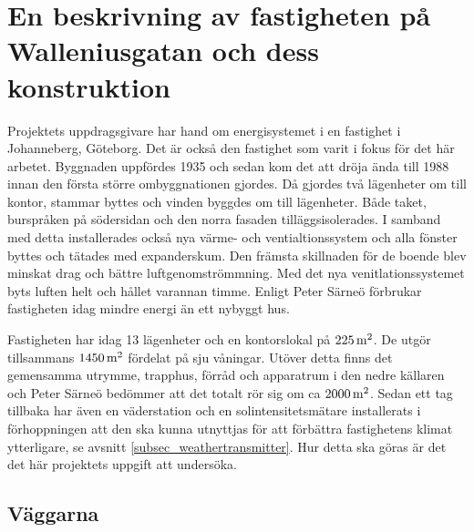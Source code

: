 \section{En beskrivning av fastigheten på Walleniusgatan och dess konstruktion}
\label{subsec:thehouse}




Projektets uppdragsgivare har hand om energisystemet i en fastighet i Johanneberg, Göteborg. Det är också den fastighet som varit i fokus för det här arbetet. Byggnaden uppfördes 1935\cite{ritningar_urspr} och sedan kom det att dröja ända till 1988 innan den första större ombyggnationen gjordes. Då gjordes två lägenheter om till kontor, stammar byttes och vinden byggdes om till lägenheter. Både taket, burspråken på södersidan och den norra fasaden tilläggsisolerades. I samband med detta installerades också nya värme- och ventialtionssystem och alla fönster byttes och tätades med expanderskum. Den främsta skillnaden för de boende blev minskat drag och bättre luftgenomströmmning.  Med det nya venitlationssystemet byts luften helt och hållet varannan timme. Enligt Peter Särneö\cite{petersarneo} förbrukar fastigheten idag mindre energi än ett nybyggt hus.

Fastigheten har idag 13 lägenheter och en kontorslokal på $\unit[225]{m^2}$. De utgör tillsammans $\unit[1450]{m^2}$ fördelat på sju våningar. Utöver detta finns det gemensamma utrymme, trapphus, förråd och apparatrum i den nedre källaren och Peter Särneö\cite{petersarneo} bedömmer att det totalt rör sig om ca $\unit[2000]{m^2}$. Sedan ett tag tillbaka har även en väderstation och en solintensitetsmätare installerats i förhoppningen att den ska kunna utnyttjas för att förbättra fastighetens klimat ytterligare, se avsnitt \ref{subsec_weathertransmitter}. Hur detta ska göras är det det här projektets uppgift att undersöka.


\subsection{Väggarna}

